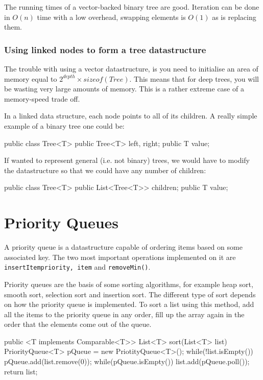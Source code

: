 The running times of a vector-backed binary tree are good. Iteration can be done
in $O(n)$ time with a low overhead, swapping elements is $O(1)$ as is replacing
them.

\subsubsection{Using linked nodes to form a tree datastructure}

The trouble with using a vector datastructure, is you need to initialise an area
of memory equal to $2^{depth} \times sizeof(Tree)$. This means that for deep
trees, you will be wasting very large amounts of memory. This is a rather
extreme case of a memory-speed trade off.

In a linked data structure, each node points to all of its children. A really
simple example of a binary tree one could be:

\begin{javacode}
  public class Tree<T> {
    public Tree<T> left, right;
    public T value;
  }
\end{javacode}

If wanted to represent general (i.e. not binary) trees, we would have to modify
the datastructure so that we could have any number of children:

\begin{javacode}
  public class Tree<T> {
    public List<Tree<T>> children;
    public T value;
  }
\end{javacode}

\section{Priority Queues}

A priority queue is a datastructure capable of ordering items based on some
associated key. The two most important operations implemented on it are
\texttt{insertItem{priority, item}} and \texttt{removeMin()}.

Priority queues are the basis of some sorting algorithms, for example heap sort,
smooth sort, selection sort and insertion sort. The different type of sort
depends on how the priority queue is implemented. To sort a list using this
method, add all the items to the priority queue in any order, fill up the array
again in the order that the elements come out of the queue.

\begin{javacode}
  public <T implements Comparable<T>> List<T> sort(List<T> list) {
    PriorityQueue<T> pQueue = new PriotityQueue<T>();
    while(!list.isEmpty()) {
      pQueue.add(list.remove(0));
    }
    while(pQueue.isEmpty()) {
      list.add(pQueue.poll());
    }
    return list;
  }
\end{javacode}

